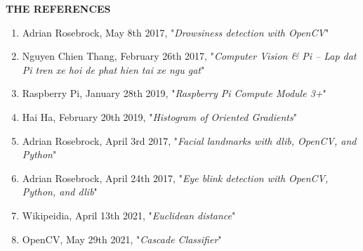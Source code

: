 \documentclass[a4paper,13pt]{report}
\begin{document}
    \newpage
    \tableofcontents
    \listoffigures

    

    

    

    

    

    

    \newpage
    \thispagestyle{plain}
    \begin{center}
        \Huge{\textbf{THE REFERENCES}}
    \end{center}
    \vspace{3mm}
    \begin{enumerate}
        \item Adrian Rosebrock, May 8th 2017, "\textit{Drowsiness detection with OpenCV}"
        \item Nguyen Chien Thang, February 26th 2017, "\textit{Computer Vision \& Pi – Lap dat Pi tren xe hoi de phat hien tai xe ngu gat}"
        \item Raspberry Pi, January 28th 2019, "\textit{Raspberry Pi Compute Module 3+}"
        \item Hai Ha, February 20th 2019, "\textit{Histogram of Oriented Gradients}"
        \item Adrian Rosebrock, April 3rd 2017, "\textit{Facial landmarks with dlib, OpenCV, and Python}"
        \item Adrian Rosebrock, April 24th 2017, "\textit{Eye blink detection with OpenCV, Python, and dlib}"
        \item Wikipeidia, April 13th 2021, "\textit{Euclidean distance}"
        \item OpenCV, May 29th 2021, "\textit{Cascade Classifier}"
    \end{enumerate}
\end{document}
